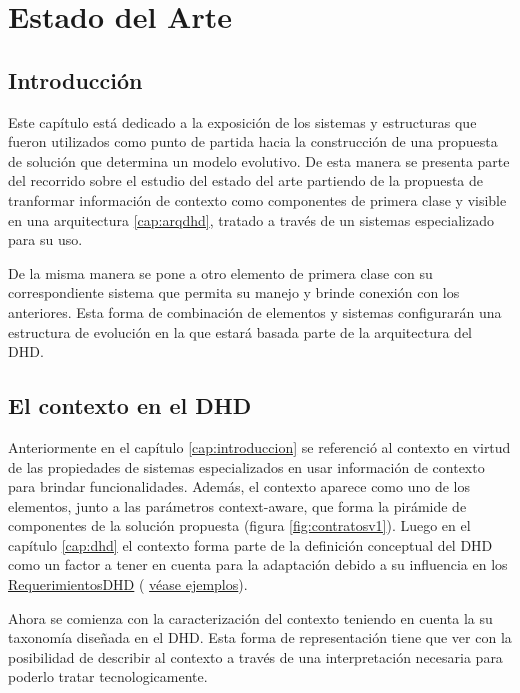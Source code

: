 \chapter{Estado del Arte} \label{cap:estadodelarte}


\section{Introducción}

Este capítulo está dedicado a la exposición de los sistemas y estructuras
que fueron utilizados como punto de partida hacia la construcción de una
propuesta de solución que determina un modelo evolutivo. De esta manera se
presenta parte del recorrido sobre el estudio del estado del arte partiendo de
la propuesta de tranformar información de contexto como componentes de primera
clase y visible en una arquitectura \ref{cap:arqdhd}, tratado a través de un
sistemas especializado para su uso.


De la misma manera se pone a otro elemento de primera clase con su
correspondiente sistema que permita su manejo y brinde conexión con
los anteriores.
Esta forma de combinación de elementos y sistemas configurarán una estructura
de evolución en la que estará basada parte de la arquitectura del DHD.


\section{El contexto en el DHD}

Anteriormente en el capítulo \ref{cap:introduccion} se referenció al contexto en
virtud de las propiedades de sistemas especializados en usar información
de contexto para brindar funcionalidades. Además, el contexto aparece como uno
de los elementos, junto a las parámetros context-aware, que forma la
pirámide
de componentes de la solución propuesta (figura \ref{fig:contratosv1}). Luego en
el capítulo \ref{cap:dhd} el contexto forma parte de la definición conceptual
del DHD como un factor a tener en cuenta para la adaptación debido a su
influencia en los \hyperref[requerimientosdhd]{RequerimientosDHD} (
\hyperref[ejemplo1]{véase ejemplos}). 

Ahora se comienza con la caracterización del contexto teniendo en cuenta la
su taxonomía diseñada en el DHD.
Esta forma de representación tiene que ver con la  posibilidad de describir al
contexto a través de una interpretación necesaria para poderlo
tratar tecnologicamente. 



